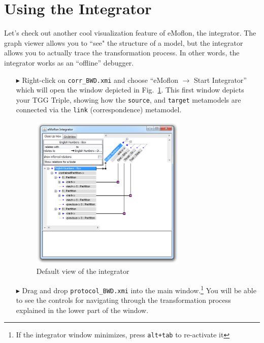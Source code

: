 \newpage
\section{Using the Integrator}
\genHeader
\label{sec:app_integrator}

Let's check out another cool visualization feature of eMoflon, the integrator. The graph viewer allows you to ``see" the structure of a model, but the
integrator allows you to actually trace the transformation process. In other words, the integrator works as an ``offline'' debugger.

\begin{itemize}

\item[$\blacktriangleright$] Right-click on \texttt{corr\_BWD.xmi} and choose ``eMoflon $\rightarrow$ Start Integrator'' which will open the window depicted in
Fig.~\ref{eclipse:integrator_start}. This first window depicts your TGG Triple, showing how the \texttt{source}, and \texttt{target} metamodels are connected
via the \texttt{link} (correspondence) metamodel.

\begin{figure}[htbp]
\begin{center}
  \includegraphics[width=0.7\textwidth]{eclipse_integratorStart}
  \caption{Default view of the integrator}
  \label{eclipse:integrator_start}
\end{center}
\end{figure}

\item[$\blacktriangleright$] Drag and drop \texttt{protocol\_BWD.xmi} into the main window.\footnote{If the integrator window minimizes, press \texttt{alt+tab}
to re-activate it} You will be able to see the controls for navigating through the transformation process explained in the lower part of the window.


\end{itemize}
